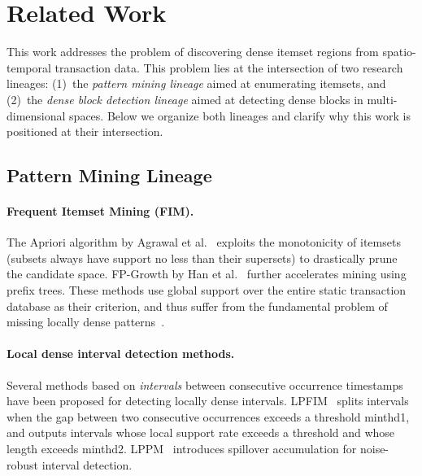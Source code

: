 \section{Related Work}\label{sec:related}

This work addresses the problem of discovering
dense itemset regions from spatio-temporal transaction data.
This problem lies at the intersection of two research lineages:
(1)~the \emph{pattern mining lineage} aimed at enumerating itemsets, and
(2)~the \emph{dense block detection lineage} aimed at detecting
dense blocks in multi-dimensional spaces.
Below we organize both lineages and clarify
why this work is positioned at their intersection.

\subsection{Pattern Mining Lineage}

\paragraph{Frequent Itemset Mining (FIM).}
The Apriori algorithm by Agrawal et al.~\cite{agrawal1994apriori}
exploits the monotonicity of itemsets
(subsets always have support no less than their supersets)
to drastically prune the candidate space.
FP-Growth by Han et al.~\cite{han2000mining}
further accelerates mining using prefix trees.
These methods use global support over the entire
static transaction database as their criterion,
and thus suffer from the fundamental problem
of missing locally dense patterns~\cite{aprioriwindow}.

\paragraph{Local dense interval detection methods.}
Several methods based on \emph{intervals} between consecutive
occurrence timestamps have been proposed
for detecting locally dense intervals.
LPFIM~\cite{mahanta2005lpfim} splits intervals
when the gap between two consecutive occurrences exceeds
a threshold minthd1, and outputs intervals
whose local support rate exceeds a threshold
and whose length exceeds minthd2.
LPPM~\cite{fournierviger2021lppm} introduces
spillover accumulation for noise-robust interval detection.

